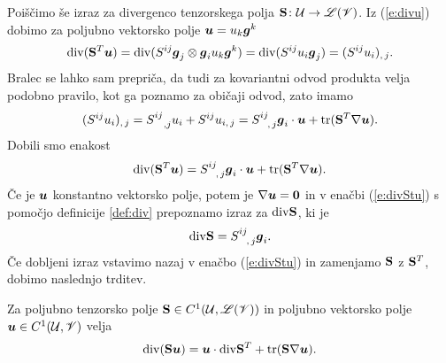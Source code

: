 Poiščimo še izraz za divergenco tenzorskega polja $\mathbf S\colon \mathcal U\to\mathscr L(\mathscr V)$.
Iz (\ref{e:divu}) dobimo za poljubno vektorsko polje $\boldsymbol u=u_k\boldsymbol g^k$
\[
	\mathrm{div}(\mathbf S^{T}\boldsymbol u)=\mathrm{div}(S^{ij}\boldsymbol g_j\otimes\boldsymbol g_i u_k\boldsymbol g^k)
	=\mathrm{div}(S^{ij}u_i\boldsymbol g_j)=(S^{ij}u_i)_{,\,j}.
\]
Bralec se lahko sam prepriča, da tudi za kovariantni odvod produkta velja
podobno pravilo, kot ga poznamo za običaji odvod, zato imamo
\[
	(S^{ij}u_i)_{,\,j}=\topbot{S}{ij}{\,,j}u_i+S^{ij}u_{i,\,j}=
	\topbot{S}{ij}{,\,j}\vek{g}_i\cdot\vek{u}+\tr(\ten{S}^{T}\nabla\vek{u}).
\]
Dobili smo enakost
\begin{equation} \label{e:divStu}
	\div(\ten{S}^{T}\vek{u})=\topbot{S}{ij}{,\,j}\vek{g}_i\cdot\vek{u}+\tr(\ten{S}^{T}\nabla\vek{u}).
\end{equation}
Če je $\boldsymbol u$ konstantno vektorsko polje, potem je $\nabla\boldsymbol u=\mathbf 0$ in v
enačbi (\ref{e:divStu}) s pomočjo definicije \ref{def:div} prepoznamo izraz za $\mathrm{div}\mathbf S$, ki je
\[
	\div\ten{S}=\topbot{S}{ij}{,\,j}\vek{g}_i.
\]
Če dobljeni izraz vstavimo nazaj v enačbo (\ref{e:divStu}) in zamenjamo $\mathbf S$ z
$\mathbf S^{T}$, dobimo naslednjo trditev.
\begin{trditev} \label{e:divSu}
	Za poljubno tenzorsko polje $\mathbf S\in C^1(\mathcal U,\mathscr L(\mathscr V))$ in poljubno
	vektorsko polje $\boldsymbol u\in C^1(\mathcal U,\mathscr V)$ velja
	\[ \mathrm{div}(\mathbf S\boldsymbol u)=\boldsymbol u\cdot\mathrm{div}\mathbf S^{T}+\mathrm{tr}(\mathbf S\nabla\boldsymbol u). \]
\end{trditev}